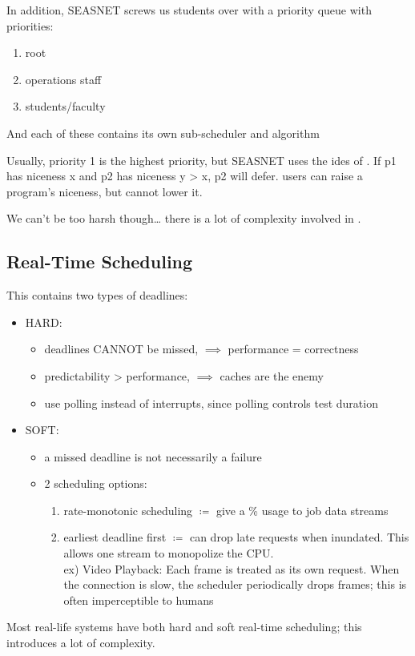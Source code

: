 \documentclass[../../lecture_notes.tex]{subfiles}
\begin{document}
In addition, SEASNET screws us students over with a priority queue with priorities:
\begin{enumerate}
\item root
\item operations staff
\item students/faculty
\end{enumerate}

And each of these contains its own sub-scheduler and algorithm

Usually, priority 1 is the highest priority, but SEASNET uses the ides of . If p1 has niceness x and p2 has niceness y > x, p2 will defer. users can raise a program’s niceness, but cannot lower it.

We can’t be too harsh though… there is a lot of complexity involved in .


\subsection{Real-Time Scheduling}

This contains two types of deadlines:
\begin{itemize}
\item HARD:
	\begin{itemize}
	\item deadlines CANNOT be missed, $\implies$ performance = correctness
	\item predictability > performance, $\implies$ caches are the enemy
	\item use polling instead of interrupts, since polling controls test duration
	\end{itemize}
\item SOFT:
	\begin{itemize}
	\item a missed deadline is not necessarily a failure
	\item 2 scheduling options:
	\begin{enumerate}
	\item rate-monotonic scheduling $\coloneqq$ give a \% usage to job data streams
	\item earliest deadline first $\coloneqq$ can drop late requests when inundated. This allows one stream to monopolize the CPU. \\
	ex) Video Playback: Each frame is treated as its own request. When the connection is slow, the scheduler periodically drops frames; this is often imperceptible to humans
	\end{enumerate}
	\end{itemize}
\end{itemize}
                

Most real-life systems have both hard and soft real-time scheduling; this introduces a lot of complexity.  
\end{document}
